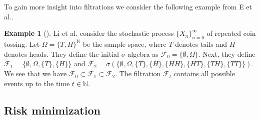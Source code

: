 \documentclass[12pt]{article}
\theoremstyle{definition}
\newtheorem{example}[example]{Example}
\numberwithin{equation}{section}
\newcommand{\N}{\mathbb{N}}
\newcommand{\R}{\mathbb{R}}
\newcommand{\CF}{\mathcal{F}}
\newcommand{\ev}[1]{\mathbb{E}\left[{#1}\right]}
\begin{document}
 To gain more insight into filtrations we consider the following example from E et al.\cite{eAppliedStochasticAnalysis2021}.
 \begin{example}[]
  Li et al. consider the stochastic process $\{X_n\}_{n=0}^\infty$ of repeated coin tossing. Let $\Omega = \{T,H\}^\N$ be the sample space, where $T$ denotes tails and $H$ denotes heads. They define the initial $\sigma$-algebra as $\CF_0 = \{\emptyset, \Omega\}$. Next, they define $\CF_1 = \{\emptyset, \Omega, \{T\}, \{H\}\}$ and $\CF_2 = \sigma(\{\emptyset, \Omega, \{T\}, \{H\}, \{HH\},\{HT\}, \{TH\},\{TT\}\})$. We see that we have $\CF_0 \subset \CF_1 \subset \CF_2$. The filtration $\CF_t$ contains all possible events up to the time $t \in \N$.
 \end{example}
\subsection{Risk minimization}
\end{document}
